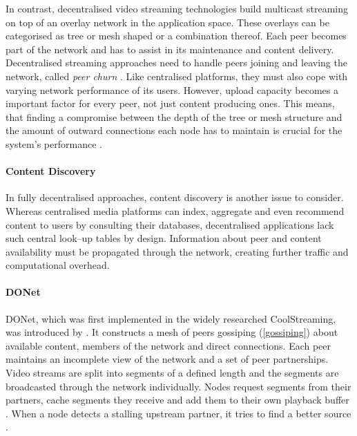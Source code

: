 In contrast, decentralised video streaming technologies build multicast streaming on top of an overlay network in the application space. These overlays can be categorised as tree or mesh shaped or a combination thereof. Each peer becomes part of the network and has to assist in its maintenance and content delivery. Decentralised streaming approaches need to handle peers joining and leaving the network, called \textit{peer churn} \cite[\S7.5]{tanenbaum_wetherall_2011}. Like centralised platforms, they must also cope with varying network performance of its users. However, upload capacity becomes a important factor for every peer, not just content producing ones. This means, that finding a compromise between the depth of the tree or mesh structure and the amount of outward connections each node has to maintain is crucial for the system's performance \cite[\SIII.A]{multicast-problems}.

\paragraph{Content Discovery}
In fully decentralised approaches, content discovery is another issue to consider. Whereas centralised media platforms can index, aggregate and even recommend content to users by consulting their databases, decentralised applications lack such central look–up tables by design. Information about peer and content availability must be propagated through the network, creating further traffic and computational overhead.

\paragraph{DONet}
DONet, which was first implemented in the widely researched CoolStreaming, was introduced by \citet{coolstreaming}. It constructs a mesh of peers gossiping (\ref{gossiping}) about available content, members of the network and direct connections. Each peer maintains an incomplete view of the network and a set of peer partnerships. Video streams are split into segments of a defined length and the segments are broadcasted through the network individually. Nodes request segments from their partners, cache segments they receive and add them to their own playback buffer \cite[\SIII.B]{coolstreaming}. When a node detects a stalling upstream partner, it tries to find a better source \cite[\SIV.A]{coolstreaming-design-theory}.

